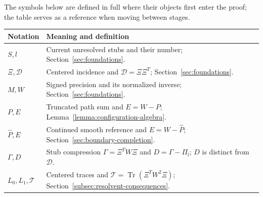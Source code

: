 The symbols below are defined in full where their objects first enter
the proof; the table serves as a reference when moving between stages.
\begin{center}
\begin{tabular}{@{}p{}p{}@{}}
\toprule
Notation&Meaning and definition\\
\midrule
$S,l$&Current unresolved stubs and their number; Section~\ref{sec:foundations}.\\
$\Xi,\mathcal D$&Centered incidence and $\mathcal D=\Xi\Xi^T$; Section~\ref{sec:foundations}.\\
$M,W$&Signed precision and its normalized inverse; Section~\ref{sec:foundations}.\\
$P,E$&Truncated path sum and $E=W-P$; Lemma~\ref{lemma:configuration-algebra}.\\
$\widehat P,E$&Continued smooth reference and $E=W-\widehat P$; Section~\ref{sec:boundary-completion}.\\
$\Gamma,D$&Stub compression $\Gamma=\Xi^TW\Xi$ and $D=\Gamma-\Pi_l$; $D$ is distinct from $\mathcal D$.\\
$L_0,L_1,\mathcal T$&Centered traces and $\mathcal T=\operatorname{Tr}(\Xi^TW^2\Xi)$; Section~\ref{subsec:resolvent-consequences}.\\
\bottomrule
\end{tabular}
\end{center}

